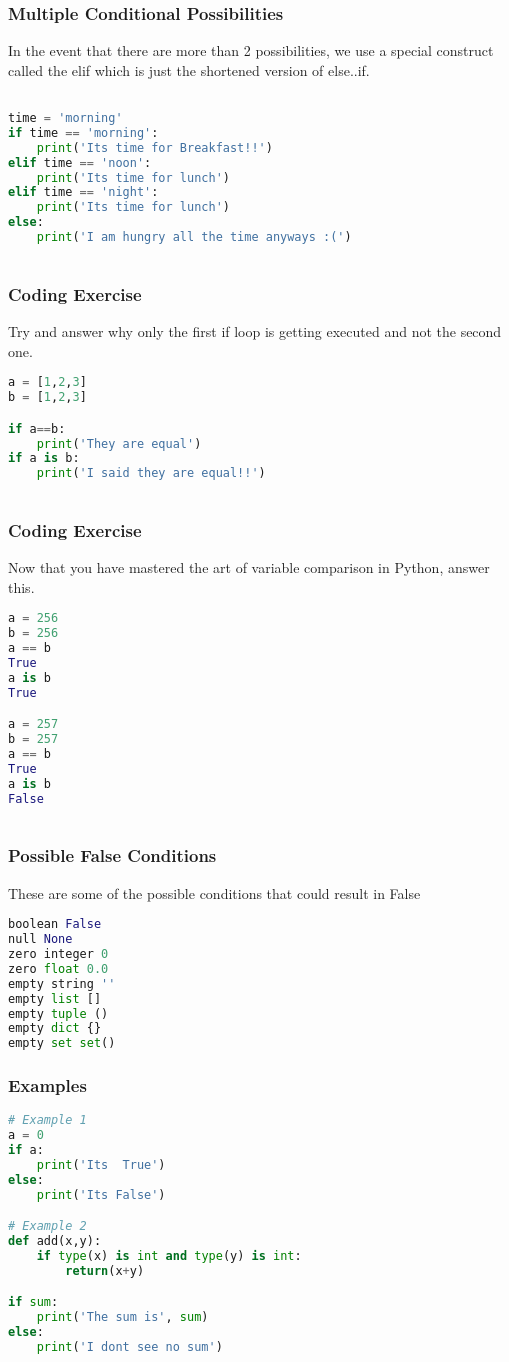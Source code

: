 \documentclass{beamer}
\begin{document}
\begin{frame}[fragile]
\frametitle{Multiple Conditional Possibilities}
In the event that there are more than 2 possibilities, we use a special construct called the elif which is just the shortened version of else..if.
\begin{lstlisting}[language=Python]

time = 'morning'
if time == 'morning':
    print('Its time for Breakfast!!')
elif time == 'noon':
    print('Its time for lunch')
elif time == 'night':
    print('Its time for lunch')
else:
    print('I am hungry all the time anyways :(')
	
\end{lstlisting}
\end{frame}

\begin{frame}[fragile]
\frametitle{Coding Exercise}
Try and answer why only the first if loop is getting executed and not the second one.
\begin{lstlisting}[language=Python]
a = [1,2,3]
b = [1,2,3]

if a==b:
    print('They are equal')
if a is b:
    print('I said they are equal!!')
	
\end{lstlisting}
\end{frame}

\begin{frame}[fragile]
\frametitle{Coding Exercise}
Now that you have mastered the art of variable comparison in Python, answer this.
\begin{lstlisting}[language=Python]
a = 256
b = 256
a == b
True
a is b
True

a = 257
b = 257
a == b
True
a is b
False
	
\end{lstlisting}
\end{frame}

\begin{frame}[fragile]
\frametitle{Possible False Conditions}
These are some of the possible conditions that could result in False
\begin{lstlisting}[language=Python]
boolean False
null None
zero integer 0
zero float 0.0
empty string ''
empty list []
empty tuple ()
empty dict {}
empty set set()
\end{lstlisting}
\end{frame}

\begin{frame}[fragile]
\frametitle{Examples}
\begin{lstlisting}[language=Python]
# Example 1
a = 0
if a:
	print('Its  True')
else:
	print('Its False')

# Example 2
def add(x,y):
    if type(x) is int and type(y) is int:
        return(x+y)

if sum:
    print('The sum is', sum)
else:
    print('I dont see no sum')
\end{lstlisting}
\end{frame}
\end{document}
